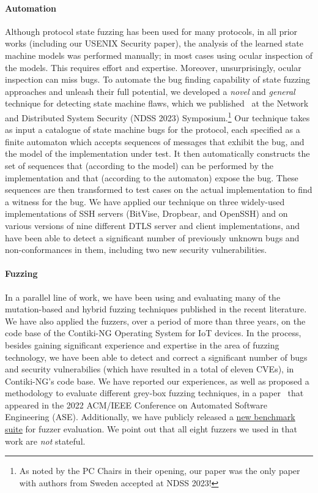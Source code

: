 \documentclass[11pt]{article}
\newcommand{\myparagraph}{}
\let\myparagraph=\paragraph
\renewcommand{\paragraph}{\vspace{-3mm}\myparagraph}
\begin{document}
\paragraph{Automation}
Although protocol state fuzzing has been used for many protocols, in all prior
works (including our USENIX Security paper), the analysis of the learned state
machine models was performed manually; in most cases using ocular inspection
of the models.  This requires effort and expertise.  Moreover, unsurprisingly,
ocular inspection can miss bugs.  To automate the bug finding capability of
state fuzzing approaches and unleash their full potential, we developed a
\emph{novel} and \emph{general} technique for detecting state machine flaws,
which we published~\cite{AutomataBased@NDSS-23} at the Network and Distributed
System Security (NDSS 2023) Symposium.\footnote{As noted by the PC Chairs in
their opening, our paper was the only paper with authors from Sweden accepted
at NDSS 2023!}
%
Our technique takes as input a catalogue of state machine bugs for the
protocol, each specified as a finite automaton which accepts sequences of
messages that exhibit the bug, and the model of the implementation under
test. It then automatically constructs the set of sequences that (according to
the model) can be performed by the implementation and that (according to the
automaton) expose the bug. These sequences are then transformed to test cases
on the actual implementation to find a witness for the bug. We have applied
our technique on three widely-used implementations of SSH servers (BitVise,
Dropbear, and OpenSSH) and on various versions of nine different DTLS server
and client implementations, and have been able to detect a significant number
of previously unknown bugs and non-conformances in them, including two new
security vulnerabilities.

\paragraph{Fuzzing}
In a parallel line of work, we have been using and evaluating many of the
mutation-based and hybrid fuzzing techniques published in the recent
literature. We have also applied the fuzzers, over a period of more than three
years, on the code base of the Contiki-NG Operating System for IoT devices. In
the process, besides gaining significant experience and expertise in the area
of fuzzing technology, we have been able to detect and correct a significant
number of bugs and security vulnerabilies (which have resulted in a total of
eleven CVEs), in Contiki-NG's code base. We have reported our experiences, as
well as proposed a methodology to evaluate different grey-box fuzzing
techniques, in a paper~\cite{SoManyFuzzers@ASE-22} that appeared in the 2022
ACM/IEEE Conference on Automated Software Engineering (ASE).  Additionally, we
have publicly released a
\href{https://github.com/assist-project/so-many-fuzzers-artifact}{new
  benchmark suite} for fuzzer evaluation.
%
We point out that all eight fuzzers we used in that work are \emph{not}
stateful.
\end{document}
